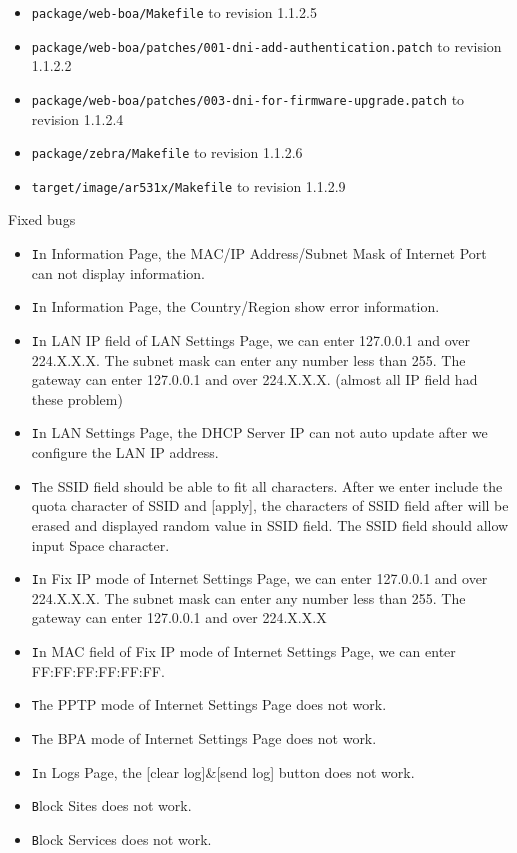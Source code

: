 \documentclass[12pt]{report}
\begin{document}
\begin{itemize}
\begin{enumerate}
\begin{itemize}
	\item \texttt{package/web-boa/Makefile} to revision 1.1.2.5
	\item \texttt{package/web-boa/patches/001-dni-add-authentication.patch} to revision 1.1.2.2
	\item \texttt{package/web-boa/patches/003-dni-for-firmware-upgrade.patch} to revision 1.1.2.4
	\item \texttt{package/zebra/Makefile} to revision 1.1.2.6
	\item \texttt{target/image/ar531x/Makefile} to revision 1.1.2.9
\end{itemize}
  Fixed bugs 
  \begin{itemize}
  \item \texttt In Information Page, the MAC/IP Address/Subnet Mask of Internet Port can not display information.
  \item \texttt In Information Page, the Country/Region show error information.
  \item \texttt In LAN IP field of LAN Settings Page, we can enter 127.0.0.1 and over 224.X.X.X. The subnet mask can enter any number less than 255. The gateway can enter 127.0.0.1 and over 224.X.X.X. (almost all IP field had these problem)
  \item \texttt In LAN Settings Page, the DHCP Server IP can not auto update after we configure the LAN IP address.
  \item \texttt The SSID field should be able to fit all characters. After we enter include the quota character of SSID and [apply], the characters of SSID field after will be erased and displayed random value in SSID field.
The SSID field should allow input Space character.
  \item \texttt In Fix IP mode of Internet Settings Page, we can enter 127.0.0.1 and over 224.X.X.X. The subnet mask can enter any number less than 255. The gateway can enter 127.0.0.1 and over 224.X.X.X
  \item \texttt In MAC field of Fix IP mode of Internet Settings Page, we can enter FF:FF:FF:FF:FF:FF.
  \item \texttt The PPTP mode of Internet Settings Page does not work.
  \item \texttt The BPA mode of Internet Settings Page does not work.
  \item \texttt In Logs Page, the [clear log]&[send log] button does not work.
  \item \texttt Block Sites does not work.
  \item \texttt Block Services does not work.

\end{itemize}
\end{enumerate}
\end{itemize}
\end{document}
